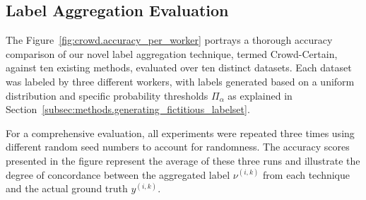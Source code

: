 \subsection{Label Aggregation Evaluation}
The Figure~\ref{fig:crowd.accuracy_per_worker} portrays a thorough accuracy comparison of our novel label aggregation technique, termed Crowd-Certain, against ten existing methods, evaluated over ten distinct datasets. Each dataset was labeled by three different workers, with labels generated based on a uniform distribution and specific probability thresholds $\Pi_\alpha$ as explained in Section~\ref{subsec:methods.generating_fictitious_labelset}.

For a comprehensive evaluation, all experiments were repeated three times using different random seed numbers to account for randomness. The accuracy scores presented in the figure represent the average of these three runs and illustrate the degree of concordance between the aggregated label $\nu^{(i,k)}$ from each technique and the actual ground truth $y^{(i,k)}$.

